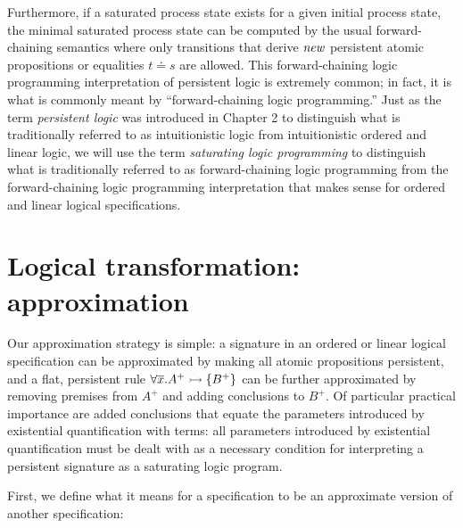 Furthermore, if a saturated process state exists for a given initial
process state, the minimal saturated process state can be computed by
the usual forward-chaining semantics where only transitions that
derive ${\it new}$ persistent atomic propositions or equalities $t
\doteq s$ are allowed. This forward-chaining logic programming
interpretation of persistent logic is extremely common; in fact, it is
what is commonly meant by ``forward-chaining logic programming.'' Just
as the term {\it persistent logic} was introduced in Chapter 2 to
distinguish what is traditionally referred to as intuitionistic logic
from intuitionistic ordered and linear logic, we will use the term
{\it saturating logic programming} to distinguish what is
traditionally referred to as forward-chaining logic programming from
the forward-chaining logic programming interpretation that makes sense
for ordered and linear logical specifications.

\section{Logical transformation: approximation}
\label{sec:abstraction}

Our approximation strategy is simple: a signature in an ordered or
linear logical specification can be approximated by making all atomic
propositions persistent, and a flat, persistent rule $\forall
\overline{x}. A^+ \rightarrowtail \{ B^+ \}$ can be further approximated by
removing premises from $A^+$ and adding conclusions to $B^+$. Of
particular practical importance are added conclusions that equate the
parameters introduced by existential quantification with terms: all
parameters introduced by existential quantification must be dealt with
as a necessary condition for interpreting a persistent signature as a
saturating logic program.

First, we define what it means for a specification to be an approximate
version of another specification:

